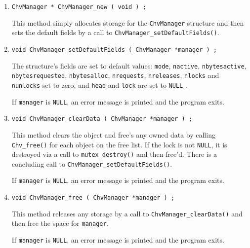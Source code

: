 \begin{enumerate}
\item
\begin{verbatim}
ChvManager * ChvManager_new ( void ) ;
\end{verbatim}
This method simply allocates storage 
for the {\tt ChvManager} structure 
and then sets the default fields by a call to 
{\tt ChvManager\_setDefaultFields()}.
\item
\begin{verbatim}
void ChvManager_setDefaultFields ( ChvManager *manager ) ;
\end{verbatim}
The structure's fields are set to default values:
{\tt mode}, 
{\tt nactive}, 
{\tt nbytesactive},
{\tt nbytesrequested},
{\tt nbytesalloc},
{\tt nrequests},
{\tt nreleases},
{\tt nlocks} and
{\tt nunlocks} 
set to zero,
and {\tt head} and {\tt lock} 
are set to {\tt NULL} .
\par {}
If {\tt manager} is {\tt NULL},
an error message is printed and the program exits.
\item
\begin{verbatim}
void ChvManager_clearData ( ChvManager *manager ) ;
\end{verbatim}
This method clears the object and free's any owned data
by calling {\tt Chv\_free()} for each object on the free
list.
If the lock is not {\tt NULL}, it is destroyed via a call to
{\tt mutex\_destroy()} and then free'd.
There is a concluding call to 
{\tt ChvManager\_setDefaultFields()}.
\par {}
If {\tt manager} is {\tt NULL},
an error message is printed and the program exits.
\item
\begin{verbatim}
void ChvManager_free ( ChvManager *manager ) ;
\end{verbatim}
This method releases any storage by a call to 
{\tt ChvManager\_clearData()} 
and then free the space for {\tt manager}.
\par {}
If {\tt manager} is {\tt NULL},
an error message is printed and the program exits.
\end{enumerate}
\par
